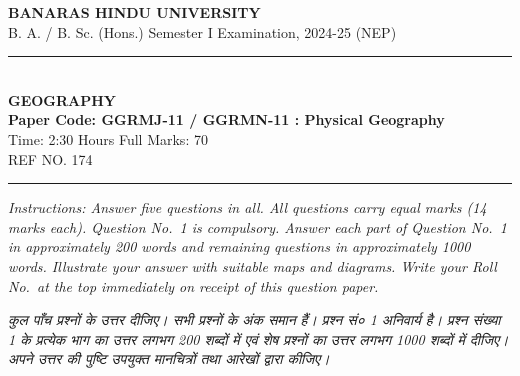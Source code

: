 \documentclass[11pt,a4paper]{article}
\begin{document}
\begin{center}
  {\large\bfseries BANARAS HINDU UNIVERSITY}\\[2pt]
  {\normalsize B. A. / B. Sc. (Hons.) Semester I Examination, 2024-25 (NEP)}\\[6pt]
  \rule{0.8\linewidth}{0.5pt}\\[6pt]
  {\large\bfseries GEOGRAPHY}\\[4pt]
  {\large\bfseries Paper Code: GGRMJ-11 / GGRMN-11 : Physical Geography}\\[4pt]
  {\normalsize Time: 2:30 Hours \hfill Full Marks: 70}\\[2pt]
  {\small REF NO. 174}
\end{center}
\rule{\linewidth}{0.4pt}
\smallskip

\noindent \textit{Instructions: Answer five questions in all. All questions carry equal marks (14 marks each). Question No.\ 1 is compulsory. Answer each part of Question No.\ 1 in approximately 200 words and remaining questions in approximately 1000 words. Illustrate your answer with suitable maps and diagrams. Write your Roll No.\ at the top immediately on receipt of this question paper.}

\smallskip
\noindent \textit{कुल पाँच प्रश्नों के उत्तर दीजिए। सभी प्रश्नों के अंक समान हैं। प्रश्न सं० 1 अनिवार्य है। प्रश्न संख्या 1 के प्रत्येक भाग का उत्तर लगभग 200 शब्दों में एवं शेष प्रश्नों का उत्तर लगभग 1000 शब्दों में दीजिए। अपने उत्तर की पुष्टि उपयुक्त मानचित्रों तथा आरेखों द्वारा कीजिए।}

\bigskip
\end{document}
